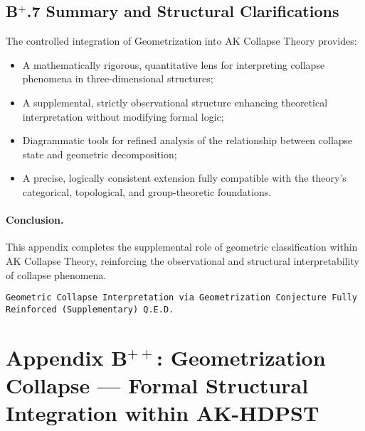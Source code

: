 \documentclass[11pt]{article}
\begin{document}
\subsection*{B$^{+}$.7 Summary and Structural Clarifications}

The controlled integration of Geometrization into AK Collapse Theory provides:

\begin{itemize}
    \item A mathematically rigorous, quantitative lens for interpreting collapse phenomena in three-dimensional structures;
    \item A supplemental, strictly observational structure enhancing theoretical interpretation without modifying formal logic;
    \item Diagrammatic tools for refined analysis of the relationship between collapse state and geometric decomposition;
    \item A precise, logically consistent extension fully compatible with the theory's categorical, topological, and group-theoretic foundations.
\end{itemize}

\paragraph{Conclusion.} This appendix completes the supplemental role of geometric classification within AK Collapse Theory, reinforcing the observational and structural interpretability of collapse phenomena.

\begin{flushright}
\texttt{Geometric Collapse Interpretation via Geometrization Conjecture \quad Fully Reinforced (Supplementary) \quad Q.E.D.}
\end{flushright}




\section*{Appendix B$^{++}$: Geometrization Collapse — Formal Structural Integration within AK-HDPST}
\end{document}
